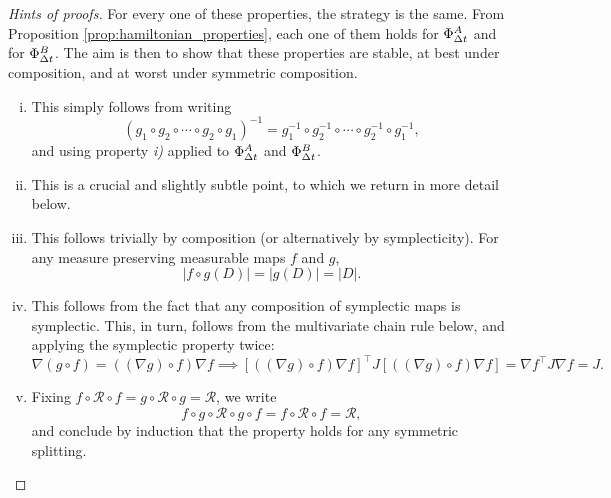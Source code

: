     \begin{proof}[Hints of proofs]
        For every one of these properties, the strategy is the same. From Proposition \ref{prop:hamiltonian_properties}, each one of them holds for $\Phi_{{\Delta t}}^A$ and for $\Phi_{{\Delta t}}^B$.
        The aim is then to show that these properties are stable, at best under composition, and at worst under symmetric composition.
        \begin{enumerate}[i)]
            \item This simply follows from writing \[\left(g_1 \circ g_2 \circ \dotsm \circ g_2\circ g_1\right)^{-1}=g_1^{-1}\circ g_2^{-1}\circ \dotsm \circ g_2^{-1}\circ g_1^{-1},\] and using property \textit{i)} applied to $\Phi_{{\Delta t}}^A$ and $\Phi_{{\Delta t}}^B$.
            \item This is a crucial and slightly subtle point, to which we return in more detail below.
            \item This follows trivially by composition (or alternatively by symplecticity). For any measure preserving measurable maps $f$ and $g$, \[|f \circ g(D)|=|g(D)|=|D|.\] 
            \item This follows from the fact that any composition of symplectic maps is symplectic. This, in turn, follows from the multivariate chain rule below, and applying the symplectic property twice: \[\nabla(g\circ f)= \left((\nabla g)\circ f\right)\nabla f\implies \left[\left((\nabla g)\circ f\right)\nabla f\right]^\intercal J\left[\left((\nabla g)\circ f\right)\nabla f\right]=\nabla f^\intercal J \nabla f=J.\]
            \item Fixing $f \circ \mathcal R \circ f = g \circ \mathcal R \circ g = \mathcal R$, we write \[f\circ g \circ \mathcal R \circ g \circ f = f \circ \mathcal R \circ f = \mathcal R,\] and conclude by induction that the property holds for any symmetric splitting.
        \end{enumerate}
    \end{proof}

